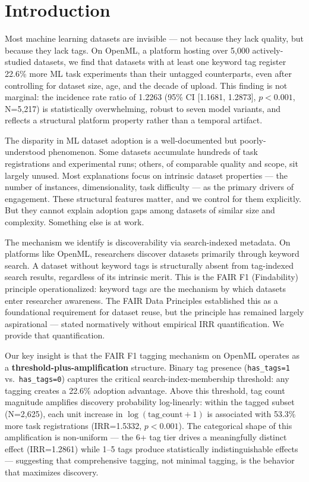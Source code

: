 \section{Introduction}

Most machine learning datasets are invisible --- not because they lack quality, but because they lack tags. On OpenML, a platform hosting over 5,000 actively-studied datasets, we find that datasets with at least one keyword tag register 22.6\% more ML task experiments than their untagged counterparts, even after controlling for dataset size, age, and the decade of upload. This finding is not marginal: the incidence rate ratio of 1.2263 (95\% CI [1.1681, 1.2873], $p<0.001$, N=5,217) is statistically overwhelming, robust to seven model variants, and reflects a structural platform property rather than a temporal artifact.

The disparity in ML dataset adoption is a well-documented but poorly-understood phenomenon. Some datasets accumulate hundreds of task registrations and experimental runs; others, of comparable quality and scope, sit largely unused. Most explanations focus on intrinsic dataset properties --- the number of instances, dimensionality, task difficulty --- as the primary drivers of engagement. These structural features matter, and we control for them explicitly. But they cannot explain adoption gaps among datasets of similar size and complexity. Something else is at work.

The mechanism we identify is discoverability via search-indexed metadata. On platforms like OpenML, researchers discover datasets primarily through keyword search. A dataset without keyword tags is structurally absent from tag-indexed search results, regardless of its intrinsic merit. This is the FAIR F1 (Findability) principle operationalized: keyword tags are the mechanism by which datasets enter researcher awareness. The FAIR Data Principles \citep{Wilkinson2016FAIR} established this as a foundational requirement for dataset reuse, but the principle has remained largely aspirational --- stated normatively without empirical IRR quantification. We provide that quantification.

Our key insight is that the FAIR F1 tagging mechanism on OpenML operates as a \textbf{threshold-plus-amplification} structure. Binary tag presence (\texttt{has\_tags=1} vs.\ \texttt{has\_tags=0}) captures the critical search-index-membership threshold: any tagging creates a 22.6\% adoption advantage. Above this threshold, tag count magnitude amplifies discovery probability log-linearly: within the tagged subset (N=2,625), each unit increase in $\log(\text{tag\_count}+1)$ is associated with 53.3\% more task registrations (IRR=1.5332, $p<0.001$). The categorical shape of this amplification is non-uniform --- the 6+ tag tier drives a meaningfully distinct effect (IRR=1.2861) while 1--5 tags produce statistically indistinguishable effects --- suggesting that comprehensive tagging, not minimal tagging, is the behavior that maximizes discovery.

